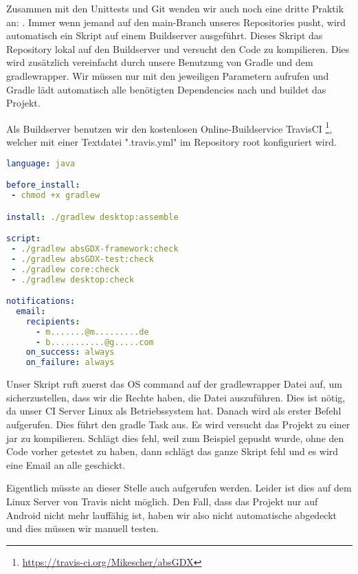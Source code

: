 Zusammen mit den Unittests und Git wenden wir auch noch eine dritte Praktik an: .
Immer wenn jemand auf den main-Branch unseres Repositories pusht, wird automatisch ein Skript auf einem Buildserver ausgeführt.
Dieses Skript  das Repository lokal auf den Buildserver und versucht den Code zu kompilieren. Dies wird zusätzlich vereinfacht durch unsere Benutzung von Gradle und dem gradlewrapper. Wir müssen nur  mit den jeweiligen Parametern aufrufen und Gradle lädt automatisch alle benötigten Dependencies nach und buildet das Projekt.

Als Buildserver benutzen wir den kostenlosen Online-Buildservice TravisCI \footnote{\url{https://travis-ci.org/Mikescher/absGDX}}, welcher mit einer Textdatei ".travis.yml" im Repository root konfiguriert wird.

\begin{lstlisting}[caption=TravisCI Konfiguration, title=\hspace{0 pt}, language=yaml]
language: java

before_install:
 - chmod +x gradlew

install: ./gradlew desktop:assemble

script: 
 - ./gradlew absGDX-framework:check
 - ./gradlew absGDX-test:check
 - ./gradlew core:check
 - ./gradlew desktop:check

notifications:
  email:
    recipients:
      - m.......@m.........de
      - b...........@g.....com
    on_success: always
    on_failure: always
\end{lstlisting}

Unser Skript ruft zuerst das OS command  auf der gradlewrapper Datei auf, um sicherzustellen, dass wir die Rechte haben, die Datei auszuführen. Dies ist nötig, da unser CI Server Linux als Betriebssystem hat.
Danach wird als erster Befehl  aufgerufen. Dies führt den gradle Task  aus. Es wird versucht das Projekt zu einer jar zu kompilieren. Schlägt dies fehl, weil zum Beispiel gepusht wurde, ohne den Code vorher getestet zu haben, dann schlägt das ganze Skript fehl und es wird eine Email an alle  geschickt.

Eigentlich müsste an dieser Stelle auch  aufgerufen werden. Leider ist dies auf dem Linux Server von Travis nicht möglich. Den Fall, dass das Projekt nur auf Android nicht mehr lauffähig ist, haben wir also nicht automatische abgedeckt und dies müssen wir manuell testen.

